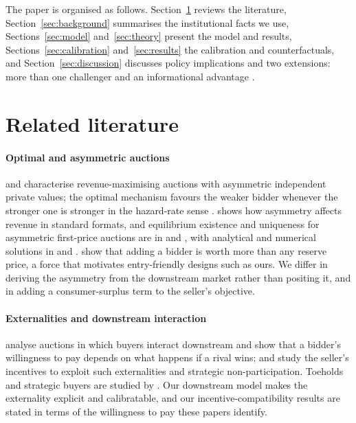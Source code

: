 \documentclass[12pt,a4paper]{article}
\theoremstyle{definition}
\theoremstyle{remark}
\begin{document}
The paper is organised as follows. Section~\ref{sec:lit} reviews the literature, Section~\ref{sec:background} summarises the institutional facts we use, Sections~\ref{sec:model} and~\ref{sec:theory} present the model and results, Sections~\ref{sec:calibration} and~\ref{sec:results} the calibration and counterfactuals, and Section~\ref{sec:discussion} discusses policy implications and two extensions: more than one challenger and an informational advantage \citep{emw1983}.

\section{Related literature}\label{sec:lit}

\paragraph{Optimal and asymmetric auctions} \citet{myerson1981} and \citet{rileysamuelson1981} characterise revenue-maximising auctions with asymmetric independent private values; the optimal mechanism favours the weaker bidder whenever the stronger one is stronger in the hazard-rate sense \citep{bulowroberts1989,maskinriley2000}. \citet{cantillon2008} shows how asymmetry affects revenue in standard formats, and equilibrium existence and uniqueness for asymmetric first-price auctions are in \citet{lebrun1999} and \citet{maskinriley2003}, with analytical and numerical solutions in \citet{kaplanzamir2012} and \citet{marshall1994}. \citet{bulowklemperer1996} show that adding a bidder is worth more than any reserve price, a force that motivates entry-friendly designs such as ours. We differ in deriving the asymmetry from the downstream market rather than positing it, and in adding a consumer-surplus term to the seller's objective.

\paragraph{Externalities and downstream interaction} \citet{jehielmoldovanu2000} analyse auctions in which buyers interact downstream and show that a bidder's willingness to pay depends on what happens if a rival wins; \citet{jms1996,jms1999} and \citet{jehielmoldovanu1996} study the seller's incentives to exploit such externalities and strategic non-participation. Toeholds and strategic buyers are studied by \citet{bulowhuangklemperer1999}. Our downstream model makes the externality explicit and calibratable, and our incentive-compatibility results are stated in terms of the willingness to pay these papers identify.
\end{document}
